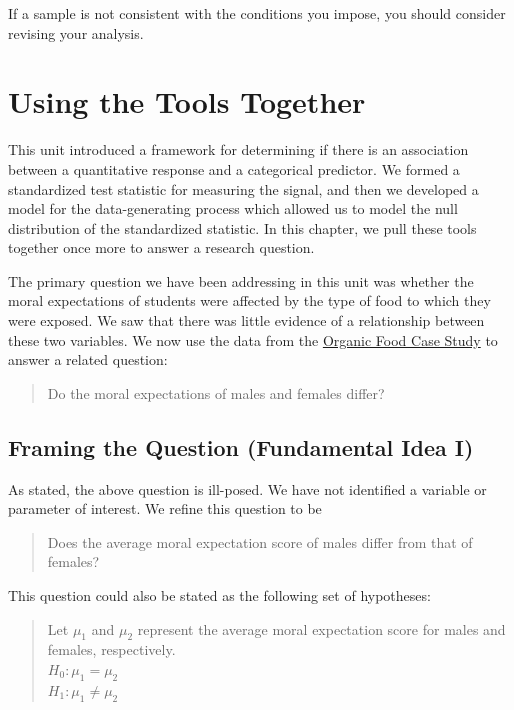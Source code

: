 \documentclass[]{book}
\theoremstyle{definition}
\theoremstyle{definition}
\theoremstyle{remark}
\begin{document}
If a sample is not consistent with the conditions you impose, you should
consider revising your analysis.

\chapter{Using the Tools Together}\label{ANOVArecap}

This unit introduced a framework for determining if there is an
association between a quantitative response and a categorical predictor.
We formed a standardized test statistic for measuring the signal, and
then we developed a model for the data-generating process which allowed
us to model the null distribution of the standardized statistic. In this
chapter, we pull these tools together once more to answer a research
question.

The primary question we have been addressing in this unit was whether
the moral expectations of students were affected by the type of food to
which they were exposed. We saw that there was little evidence of a
relationship between these two variables. We now use the data from the
\protect\hyperlink{CaseOrganic}{Organic Food Case Study} to answer a
related question:

\begin{quote}
Do the moral expectations of males and females differ?
\end{quote}

\section{Framing the Question (Fundamental Idea
I)}\label{framing-the-question-fundamental-idea-i-1}

As stated, the above question is ill-posed. We have not identified a
variable or parameter of interest. We refine this question to be

\begin{quote}
Does the average moral expectation score of males differ from that of
females?
\end{quote}

This question could also be stated as the following set of hypotheses:

\begin{quote}
Let \(\mu_1\) and \(\mu_2\) represent the average moral expectation
score for males and females, respectively.\\
\(H_0: \mu_1 = \mu_2\)\\
\(H_1: \mu_1 \neq \mu_2\)
\end{quote}
\end{document}
